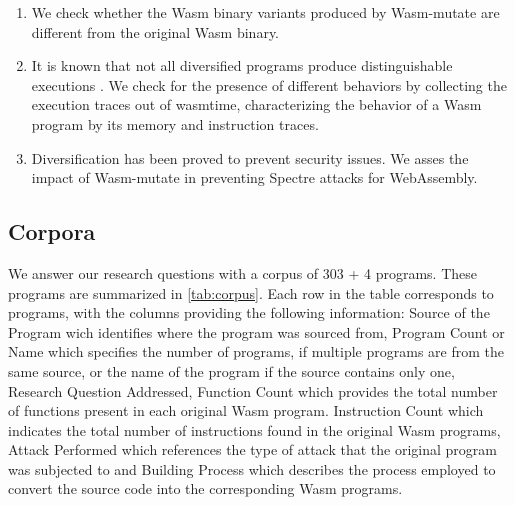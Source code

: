 \documentclass[sigplan,screen]{acmart}
\newcommand{\tool}{Wasm-mutate\xspace}
\newcommand{\wasm}{Wasm\xspace}
\newcommand{\Wasm}{WebAssembly\xspace}
\begin{document}
\begin{enumerate}[label=RQ\arabic*:, ref=RQ\arabic*]
     \item \label{rq:static} \textbf{\rqstatic}
        We  check whether the \wasm binary variants produced by \tool are different from the original \wasm binary. %
    
    \item \label{rq:dynamic}\textbf{\rqdynamic} 
        It is known that not all diversified programs produce distinguishable executions \cite{crane2015thwarting}. 
        We check for the presence of different behaviors by collecting the execution traces out of wasmtime, characterizing the behavior of a \wasm program by its memory and instruction traces.
        
    \item \label{rq:defensive}\textbf{\rqdefensive} 
     \label{rq:performance} Diversification has been proved to prevent security issues. We asses the impact of \tool in preventing Spectre attacks for \Wasm.
    
    
\end{enumerate}

\subsection{Corpora}
\label{sec:corpus}



We answer our research questions with a corpus of 303 + 4 programs.
These programs are summarized in \autoref{tab:corpus}.
Each row in the table corresponds to programs, with the columns providing the following information: Source of the Program wich identifies where the program was sourced from, Program Count or Name which specifies the number of programs, if multiple programs are from the same source, or the name of the program if the source contains only one, Research Question Addressed, Function Count which provides the total number of functions present in each original \wasm program. Instruction Count which indicates the total number of instructions found in the original \wasm programs, Attack Performed which references the type of attack that the original program was subjected to and Building Process which describes the process employed to convert the source code into the corresponding \wasm programs.
\end{document}
